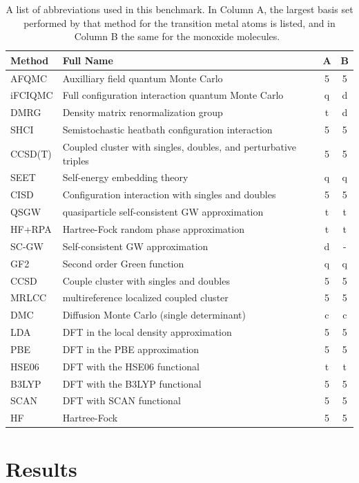  \begin{table}
 \caption{A list of abbreviations used in this benchmark.
 In Column A, the largest basis set performed by that method for the transition metal atoms is listed, and in Column B the same for the monoxide
 molecules.~\cite{williams2019direct} }\label{table:abbreviations}
 \begin{tabular} {l|p{}|c|c}
 Method & Full Name & A & B \\
 \hline
 AFQMC & Auxilliary field quantum Monte Carlo & 5 & 5\\
 iFCIQMC & Full configuration interaction quantum Monte Carlo & q & d\\
 DMRG & Density matrix renormalization group & t & d \\
 SHCI & Semistochastic heatbath configuration interaction & 5 &5 \\
 CCSD(T) & Coupled cluster with singles, doubles, and perturbative triples & 5 & 5 \\
 SEET & Self-energy embedding theory & q & q \\
 CISD & Configuration interaction with singles and doubles & 5 & 5 \\
 QSGW & quasiparticle self-consistent GW approximation & t & t \\
 HF+RPA & Hartree-Fock random phase approximation &t & t \\
 SC-GW & Self-consistent GW approximation & d & - \\
 GF2 & Second order Green function & q & q \\
 CCSD & Couple cluster with singles and doubles & 5 &5 \\
 MRLCC & multireference localized coupled cluster &5 & 5\\
 DMC & Diffusion Monte Carlo (single determinant) & c & c\\
 LDA & DFT in the local density approximation & 5 & 5\\
 PBE & DFT in the PBE approximation &5 & 5  \\
 HSE06 & DFT with the HSE06 functional &t & t\\
 B3LYP & DFT with the B3LYP functional &5 & 5\\
 SCAN & DFT with SCAN functional & 5 & 5\\
 HF & Hartree-Fock & 5 & 5\\
     \end{tabular}
 \end{table}


\section{Results}

